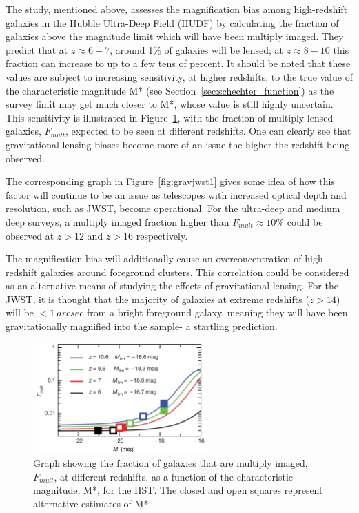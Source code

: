 		The study, mentioned above, assesses the magnification bias among high-redshift galaxies in the Hubble Ultra-Deep Field (HUDF) by calculating the fraction of galaxies above the magnitude limit which will have been multiply imaged. They predict that at $z\approx6-7$, around 1\% of galaxies will be lensed; at $z\approx8-10$ this fraction can increase to up to a few tens of percent\cite{wyithestuart2011}. It should be noted that these values are subject to increasing sensitivity, at higher redshifts, to the true value of the characteristic magnitude M* (see Section~\ref{sec:schechter_function}) as the survey limit may get much closer to M*, whose value is still highly uncertain. This sensitivity is illustrated in Figure~\ref{fig:gravhst1}, with the fraction of multiply lensed galaxies, $F_{mult}$, expected to be seen at different redshifts. One can clearly see that gravitational lensing biases become more of an issue the higher the redshift being observed.

		The corresponding graph in Figure~\ref{fig:gravjwst1} gives some idea of how this factor will continue to be an issue as telescopes with increased optical depth and resolution, such as JWST, become operational. For the ultra-deep and medium deep surveys, a multiply imaged fraction higher than $F_{mult}\approx10\%$ could be observed at $z>12$ and $z>16$ respectively.

		The magnification bias will additionally cause an overconcentration of high-redshift galaxies around foreground clusters. This correlation could be considered as an alternative means of studying the effects of gravitational lensing. For the JWST, it is thought that the majority of galaxies at extreme redshifts ($z>14$) will be $<1~arcsec$ from a bright foreground galaxy, meaning they will have been gravitationally magnified into the sample- a startling prediction\cite{wyithestuart2011}.
		\begin{figure}
			\centering
			\includegraphics[width=0.6\textwidth]{../Images/gravhst1.JPG}
			\caption{Graph showing the fraction of galaxies that are multiply imaged,  $F_{mult}$, at different redshifts, as a function of the characteristic magnitude, M*, for the HST. The closed and open squares represent alternative estimates of M*.}\label{fig:gravhst1}
		\end{figure}

